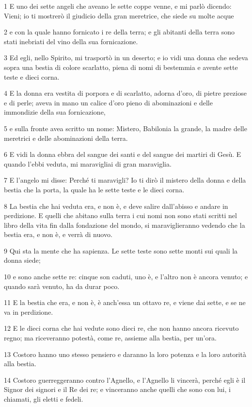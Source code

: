 \par 1 E uno dei sette angeli che aveano le sette coppe venne, e mi parlò dicendo: Vieni; io ti mostrerò il giudicio della gran meretrice, che siede su molte acque
\par 2 e con la quale hanno fornicato i re della terra; e gli abitanti della terra sono stati inebriati del vino della sua fornicazione.
\par 3 Ed egli, nello Spirito, mi trasportò in un deserto; e io vidi una donna che sedeva sopra una bestia di colore scarlatto, piena di nomi di bestemmia e avente sette teste e dieci corna.
\par 4 E la donna era vestita di porpora e di scarlatto, adorna d'oro, di pietre preziose e di perle; aveva in mano un calice d'oro pieno di abominazioni e delle immondizie della sua fornicazione,
\par 5 e sulla fronte avea scritto un nome: Mistero, Babilonia la grande, la madre delle meretrici e delle abominazioni della terra.
\par 6 E vidi la donna ebbra del sangue dei santi e del sangue dei martiri di Gesù. E quando l'ebbi veduta, mi maravigliai di gran maraviglia.
\par 7 E l'angelo mi disse: Perché ti maravigli? Io ti dirò il mistero della donna e della bestia che la porta, la quale ha le sette teste e le dieci corna.
\par 8 La bestia che hai veduta era, e non è, e deve salire dall'abisso e andare in perdizione. E quelli che abitano sulla terra i cui nomi non sono stati scritti nel libro della vita fin dalla fondazione del mondo, si maraviglieranno vedendo che la bestia era, e non è, e verrà di nuovo.
\par 9 Qui sta la mente che ha sapienza. Le sette teste sono sette monti sui quali la donna siede;
\par 10 e sono anche sette re: cinque son caduti, uno è, e l'altro non è ancora venuto; e quando sarà venuto, ha da durar poco.
\par 11 E la bestia che era, e non è, è anch'essa un ottavo re, e viene dai sette, e se ne va in perdizione.
\par 12 E le dieci corna che hai vedute sono dieci re, che non hanno ancora ricevuto regno; ma riceveranno potestà, come re, assieme alla bestia, per un'ora.
\par 13 Costoro hanno uno stesso pensiero e daranno la loro potenza e la loro autorità alla bestia.
\par 14 Costoro guerreggeranno contro l'Agnello, e l'Agnello li vincerà, perché egli è il Signor dei signori e il Re dei re; e vinceranno anche quelli che sono con lui, i chiamati, gli eletti e fedeli.
